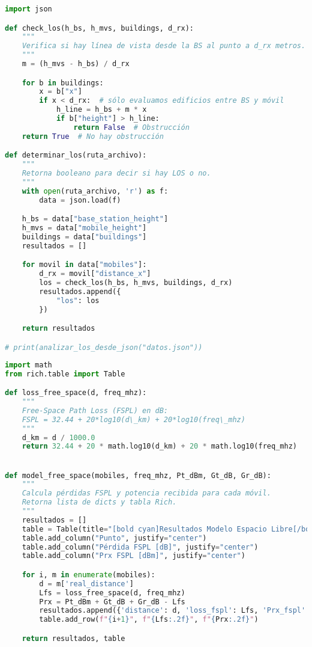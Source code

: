 \clearpage
\begin{lstlisting}[language=Python, caption={determinar\_LOS.py}]
import json

def check_los(h_bs, h_mvs, buildings, d_rx):
    """
    Verifica si hay línea de vista desde la BS al punto a d_rx metros.
    """
    m = (h_mvs - h_bs) / d_rx

    for b in buildings:
        x = b["x"]
        if x < d_rx:  # sólo evaluamos edificios entre BS y móvil
            h_line = h_bs + m * x
            if b["height"] > h_line:
                return False  # Obstrucción
    return True  # No hay obstrucción

def determinar_los(ruta_archivo):
    """
    Retorna booleano para decir si hay LOS o no.
    """
    with open(ruta_archivo, 'r') as f:
        data = json.load(f)

    h_bs = data["base_station_height"]
    h_mvs = data["mobile_height"]
    buildings = data["buildings"]
    resultados = []

    for movil in data["mobiles"]:
        d_rx = movil["distance_x"]
        los = check_los(h_bs, h_mvs, buildings, d_rx)
        resultados.append({
            "los": los
        })

    return resultados

# print(analizar_los_desde_json("datos.json"))
\end{lstlisting}
\clearpage
\begin{lstlisting}[language=Python, caption={espacio\_libre.py}]
import math
from rich.table import Table

def loss_free_space(d, freq_mhz):
    """
    Free-Space Path Loss (FSPL) en dB:
    FSPL = 32.44 + 20*log10(d\_km) + 20*log10(freq\_mhz)
    """
    d_km = d / 1000.0
    return 32.44 + 20 * math.log10(d_km) + 20 * math.log10(freq_mhz)


def model_free_space(mobiles, freq_mhz, Pt_dBm, Gt_dB, Gr_dB):
    """
    Calcula pérdidas FSPL y potencia recibida para cada móvil.
    Retorna lista de dicts y tabla Rich.
    """
    resultados = []
    table = Table(title="[bold cyan]Resultados Modelo Espacio Libre[/bold cyan]")
    table.add_column("Punto", justify="center")
    table.add_column("Pérdida FSPL [dB]", justify="center")
    table.add_column("Prx FSPL [dBm]", justify="center")

    for i, m in enumerate(mobiles):
        d = m['real_distance']
        Lfs = loss_free_space(d, freq_mhz)
        Prx = Pt_dBm + Gt_dB + Gr_dB - Lfs
        resultados.append({'distance': d, 'loss_fspl': Lfs, 'Prx_fspl': Prx})
        table.add_row(f"{i+1}", f"{Lfs:.2f}", f"{Prx:.2f}")

    return resultados, table

\end{lstlisting}
